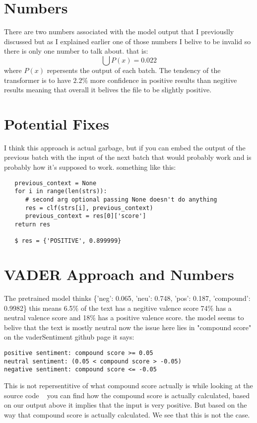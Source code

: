 \documentclass[12pt]{article}
\begin{document}
\newpage
\section{Numbers}
There are two numbers associated with the model output that I previouslly discussed but as I explained
earlier one of those numbers I belive to be invalid so there is only one number to talk about.
that is: $$ \bigcup{P(x)} = 0.022 $$ where $P(x)$ repersents the output of each batch.
The tendency of the transformer is to have $2.2\%$ more confidence in positive results
than negitive results
meaning that overall it belives the file to be slightly positive.

\section{Potential Fixes}
I think this approach is actual garbage, but if you can embed the output of the previous batch
with the input of the next batch that would probably work and is probably how it's supposed to work.
something like this:
\begin{verbatim}
   previous_context = None
   for i in range(len(strs)):
      # second arg optional passing None doesn't do anything
      res = clf(strs[i], previous_context) 
      previous_context = res[0]['score']
   return res

   $ res = {'POSITIVE', 0.899999}
\end{verbatim}

\newpage
\section{VADER Approach and Numbers}
The pretrained model thinks \{'neg': 0.065, 'neu': 0.748, 'pos': 0.187, 'compound': 0.9982\}
this means 6.5\% of the text has a negitive valence
score 74\% has a neutral valence score and 18\% has a positive
valence score.
the model seems to belive that the text is mostly neutral
now the issue here lies in "compound score"
on the vaderSentiment github page it says:
\begin{verbatim}
positive sentiment: compound score >= 0.05
neutral sentiment: (0.05 < compound score > -0.05) 
negative sentiment: compound score <= -0.05
\end{verbatim}
This is not repersentitive of what compound score actually is while looking
at the source code ~\cite{vadercode} %
you can find how the compound score is actually calculated, based on our
output above it implies that the input is very positive. But based on 
the way that compound score is actually calculated. We see that this is
not the case.
\end{document}

